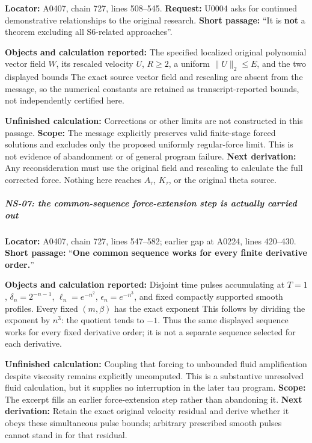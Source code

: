 \textbf{Locator:} A0407, chain 727, lines 508--545. \textbf{Request:}
U0004 asks for continued demonstrative relationships to the original
research. \textbf{Short passage:} ``It is \textbf{not} a theorem
excluding all S6-related approaches''.

\textbf{Objects and calculation reported:} The specified localized
original polynomial vector field \(W\), its rescaled velocity \(U\),
\(R\ge2\), a uniform \(\|U\|_2\le E\), and the two displayed bounds
 The exact source vector field and rescaling are absent from the
message, so the numerical constants are retained as transcript-reported
bounds, not independently certified here.

\textbf{Unfinished calculation:} Corrections or other limits are not
constructed in this passage. \textbf{Scope:} The message explicitly
preserves valid finite-stage forced solutions and excludes only the
proposed uniformly regular-force limit. This is not evidence of
abandonment or of general program failure. \textbf{Next derivation:} Any
reconsideration must use the original field and rescaling to calculate
the full corrected force. Nothing here reaches \(A_\tau\), \(K_\tau\),
or the original theta source.

\subparagraph{NS-07: the common-sequence force-extension step is
actually carried
out}\label{ns-07-the-common-sequence-force-extension-step-is-actually-carried-out}

\textbf{Locator:} A0407, chain 727, lines 547--582; earlier gap at
A0224, lines 420--430. \textbf{Short passage:} ``\textbf{One common
sequence works for every finite derivative order.}''

\textbf{Objects and calculation reported:} Disjoint time pulses
accumulating at \(T=1\), \(\delta_n=2^{-n-1}\), \(\ell_n=e^{-n^2}\),
\(\epsilon_n=e^{-n^3}\), and fixed compactly supported smooth profiles.
Every fixed \((m,\beta)\) has the exact exponent  This follows by dividing the exponent by \(n^3\): the quotient tends
to \(-1\). Thus the same displayed sequence works for every fixed
derivative order; it is not a separate sequence selected for each
derivative.

\textbf{Unfinished calculation:} Coupling that forcing to unbounded
fluid amplification despite viscosity remains explicitly uncomputed.
This is a substantive unresolved fluid calculation, but it supplies no
interruption in the later tau program. \textbf{Scope:} The excerpt fills
an earlier force-extension step rather than abandoning it. \textbf{Next
derivation:} Retain the exact original velocity residual and derive
whether it obeys these simultaneous pulse bounds; arbitrary prescribed
smooth pulses cannot stand in for that residual.

